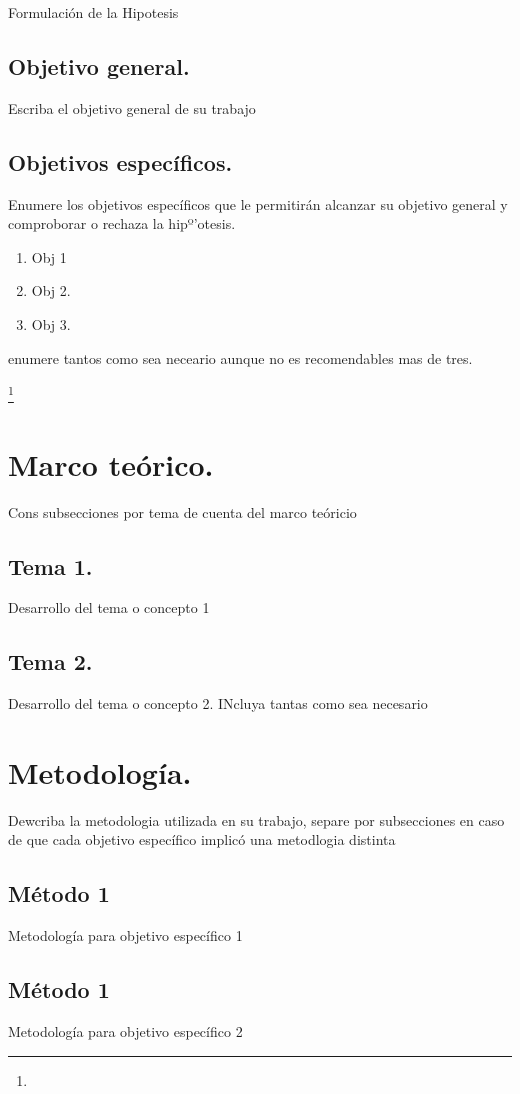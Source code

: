 \documentclass[12pt,fleqn]{article} %
\numberwithin{equation}{section}
\newcommand\blfootnote[1]{
  \begingroup
  \renewcommand\thefootnote{}\footnote{#1}
  \addtocounter{footnote}{-1}
  \endgroup
}
\begin{document}
Formulaci\'on de la Hipotesis

        \subsection{Objetivo general.}
Escriba el objetivo general de su trabajo
        \subsection{Objetivos específicos.}
        Enumere los objetivos espec\'ificos que le permitir\'an alcanzar su objetivo general y comproborar o rechaza la hipº'otesis.
            \begin{enumerate}
                \item Obj 1 
                \item Obj 2.
                \item Obj 3.
            \end{enumerate}
            enumere tantos como sea neceario aunque no es recomendables mas de tres.
\blfootnote{ }

\pagebreak

\section{Marco teórico.}
Cons subsecciones por tema de cuenta del marco te\'oricio
        \subsection{Tema 1.}
Desarrollo del tema o concepto 1
        \subsection{Tema 2.}
Desarrollo del tema o concepto 2. INcluya tantas como sea necesario


\section{Metodología.}
Dewcriba la metodologia utilizada en su trabajo, separe por subsecciones en caso de que cada objetivo espec\'ifico implic\'o una metodlogia distinta
        \subsection{M\'etodo 1}
        Metodolog\'ia para objetivo espec\'ifico 1
        \subsection{M\'etodo 1}
Metodolog\'ia para objetivo espec\'ifico 2
            
\end{document}
